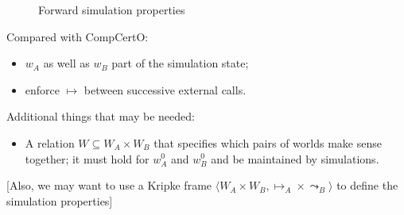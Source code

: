 \documentclass[acmsmall,screen,review,anonymous]{acmart}
\newcommand{\que}{\circ}
\newcommand{\ans}{\bullet}
\begin{document}
\begin{definition}
\begin{figure}[h]
  \caption{Forward simulation properties}
  \label{fig:fsim}
\end{figure}
\end{definition}

\noindent
Compared with CompCertO:
\begin{itemize}
  \item $w_A$ as well as $w_B$ part of the simulation state;
  \item enforce $\mapsto$ between successive external calls.
\end{itemize}
Additional things that may be needed:
\begin{itemize}
  \item A relation $W \subseteq W_A \times W_B$ that
    specifies which pairs of worlds make sense together;
    it must hold for $w_A^0$ and $w_B^0$
    and be maintained by simulations.
\end{itemize}
[Also,
we may want to use
a Kripke frame
$\langle W_A \times W_B, {\mapsto_A} \times {\leadsto_B} \rangle$
to define the simulation properties]
\end{document}
